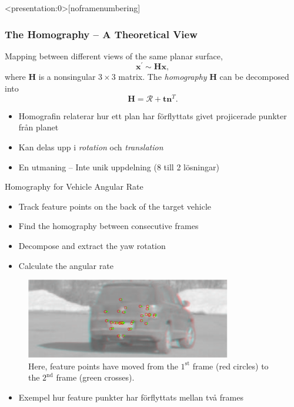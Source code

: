 \documentclass{beamer}
\renewcommand{\a}{\r{a}\xspace}
\renewcommand{\o}{\"o\xspace}
\renewcommand{\H}{\bm{H}}
\newcommand{\rotmat}{\bm{\mathcal{R}}}
\begin{document}
\begin{frame}<presentation:0>[noframenumbering]
    \frametitle{The Homography -- A Theoretical View}
	Mapping between different views of the same planar surface,
	\begin{equation*}
		\bm{x}^\prime \sim \H \bm{x},
	\end{equation*}
	where $\H$ is a nonsingular $3 \times 3$ matrix.
	\vspace{1em}
	The \textit{homography} $\H$ can be decomposed into
	\begin{equation*}
		\H = \rotmat + \bm{t} \bm{n}^T.
	\end{equation*}

	\note
	{
		\begin{itemize}
			\item Homografin relaterar hur ett plan har f\o{}rflyttats givet projicerade punkter fr\a{}n planet
			\item Kan delas upp i \textit{rotation} och \textit{translation}
			\item En utmaning -- Inte unik uppdelning (8 till 2 l\o{}sningar)
		\end{itemize}
	}
\end{frame}

\begin{frame}{Homography for Vehicle Angular Rate}
	\begin{itemize}
		\item Track feature points on the back of the target vehicle
		\item Find the homography between consecutive frames
		\item Decompose and extract the yaw rotation
		\item Calculate the angular rate
	\end{itemize}
	\begin{figure}
		\centering
		\includegraphics[width=0.8\textwidth]{feature_point_correspondence}
		\caption{Here, feature points have moved from the $1^\text{st}$ frame (red circles) to the $2^\text{nd}$ frame (green crosses).}
	\end{figure}

	\note
	{
		\begin{itemize}
			\item Exempel hur feature punkter har f\o{}rflyttats mellan tv\a frames
		\end{itemize}
	}
\end{frame}
\end{document}
